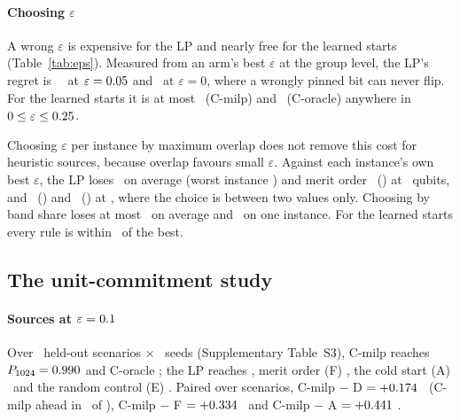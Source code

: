 \paragraph{Choosing $\varepsilon$} A wrong $\varepsilon$ is expensive for the LP and nearly free for the learned starts (Table~\ref{tab:eps}). Measured from an arm's best $\varepsilon$ at the group level, the LP's regret is \RegretEpsFiveD\ \RegretEpsFiveDCI\ at $\varepsilon=0.05$ and \RegretEpsZeroD\ at $\varepsilon=0$, where a wrongly pinned bit can never flip. For the learned starts it is at most \RegretMaxCmilp\ (C-milp) and \RegretMaxCoracle\ (C-oracle) anywhere in $0\leq\varepsilon\leq0.25$.

Choosing $\varepsilon$ per instance by maximum overlap does not remove this cost for heuristic sources, because overlap favours small $\varepsilon$. Against each instance's own best $\varepsilon$, the LP loses \ERDOvSixteen\ on average (worst instance \ERDOvWorstSixteen) and merit order \ERFOvSixteen\ (\ERFOvWorstSixteen) at \NLtwo\ qubits, and \ERDOvTwentyTwo\ (\ERDOvWorstTwentyTwo) and \ERFOvTwentyTwo\ (\ERFOvWorstTwentyTwo) at \NLfour, where the choice is between two values only. Choosing by band share loses at most \ERBandMeanMax\ on average and \ERBandWorstMax\ on one instance. For the learned starts every rule is within \ERLearnedMax\ of the best.

\begin{table}[t]
\centering
\caption{Regularisation on UC. Each arm at its best $\varepsilon^\star$ (maximising scenario-mean $P_{\KMax}$; $\varepsilon=\EpsMax$ excluded); L2, $p=1$, \NScen\ scenarios $\times$ \NSeedsSweep\ seeds. $g$: final gain. Regret: drop in group-level $P_{\KMax}$ from $\varepsilon^\star$. Last three columns: the LP (at its own $\varepsilon^\star$) minus the arm, paired over scenarios and over the \NGroupsGL\ structural groups (95\% $t$-intervals), and group-fold cross-validated over \NSplits\ splits (mean; share of splits in which D is worse).}
\label{tab:eps}
\scriptsize
\setlength{\tabcolsep}{2.5pt}
\resizebox{\textwidth}{!}{}
\end{table}

\subsection{The unit-commitment study}
\label{sec:res-arms}

\paragraph{Sources at $\varepsilon=0.1$} Over \NScen\ held-out scenarios $\times$ \NSeedsMain\ seeds (Supplementary Table~S3), C-milp reaches $P_{1024}=0.990$ and C-oracle \PgndCoracle; the LP reaches \PgndD, merit order (F) \PgndF, the cold start (A) \PgndA\ and the random control (E) \PgndE. Paired over scenarios, C-milp $-$ D $=+0.174$ \CmilpMinusDCI\ (C-milp ahead in \CmilpMinusDW\ of \CmilpMinusDN), C-milp $-$ F $=+0.334$ \CmilpMinusFCI\ and C-milp $-$ A $=+0.441$ \CmilpMinusACI.

